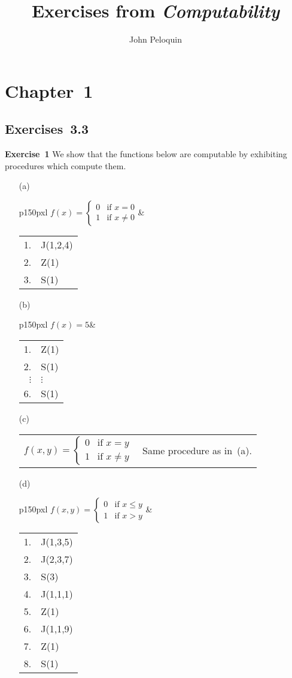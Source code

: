 \documentclass[letterpaper]{article}
\title{Exercises from \emph{Computability}}
\author{John Peloquin}
\date{}
\newcommand{\exercise}[2][]{\noindent\textbf{Exercise~{#2}}\ifthenelse{\isempty{#1}}{\textbf{.}}{ ({#1})\textbf{.}}}
\theoremstyle{plain}
\theoremstyle{definition}
\theoremstyle{remark}
\begin{document}
\maketitle

\section*{Chapter~1}
\subsection*{Exercises~3.3}
\exercise{1}
We show that the functions below are computable by exhibiting procedures which compute them.
\begin{enumerate}
\item[(a)]
\begin{tabular}{p{150px}l}
$f(x)=\begin{cases}0&\text{if }x=0\\1&\text{if }x\ne0\end{cases}$&
\begin{tabular}{rl}
1.&J(1,2,4)\\
2.&Z(1)\\
3.&S(1)
\end{tabular}
\end{tabular}

\item[(b)]
\begin{tabular}{p{150px}l}
$f(x)=5$&
\begin{tabular}{rl}
1.&Z(1)\\
2.&S(1)\\
$\vdots$&$\vdots$\\
6.&S(1)
\end{tabular}
\end{tabular}

\item[(c)]
\begin{tabular}{p{150px}l}
$f(x,y)=\begin{cases}0&\text{if }x=y\\1&\text{if }x\ne y\end{cases}$&
Same procedure as in~(a).
\end{tabular}

\item[(d)]
\begin{tabular}{p{150px}l}
$f(x,y)=\begin{cases}0&\text{if }x\le y\\1&\text{if }x>y\end{cases}$&
\begin{tabular}{rl}
1.&J(1,3,5)\\
2.&J(2,3,7)\\
3.&S(3)\\
4.&J(1,1,1)\\
5.&Z(1)\\
6.&J(1,1,9)\\
7.&Z(1)\\
8.&S(1)
\end{tabular}
\end{tabular}


\end{enumerate}
\end{document}
